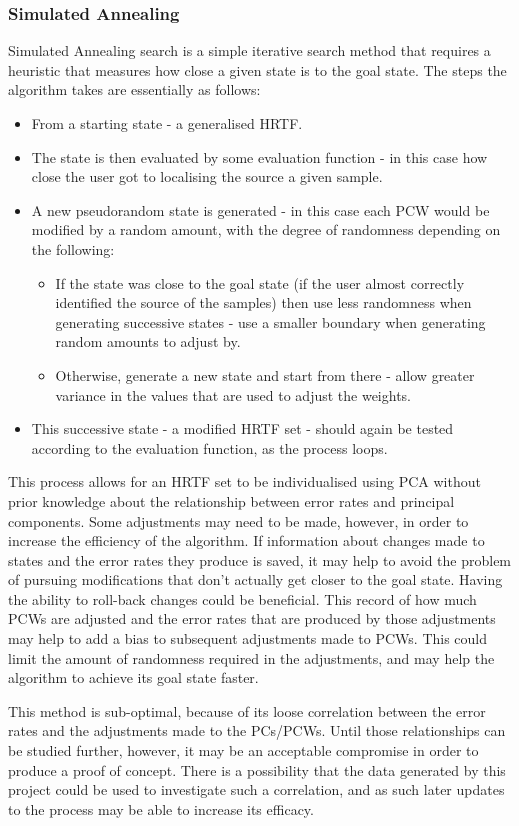 \subsubsection{Simulated Annealing}
Simulated Annealing \citep{vanLaarhoven1987} search is a simple iterative search method that requires a heuristic that measures how close a given state is to the goal state. The steps the algorithm takes are essentially as follows:
\begin{itemize}
\item From a starting state - a generalised HRTF.
\item The state is then evaluated by some evaluation function - in this case how close the user got to localising the source a given sample.
\item A new pseudorandom state is generated - in this case each PCW would be modified by a random amount, with the degree of randomness depending on the following:
\begin{itemize}
\item If the state was close to the goal state (if the user almost correctly identified the source of the samples) then use less randomness when generating successive states - use a smaller boundary when generating random amounts to adjust by.
\item Otherwise, generate a new state and start from there - allow greater variance in the values that are used to adjust the weights. 
\end{itemize}
\item This successive state - a modified HRTF set - should again be tested according to the evaluation function, as the process loops. 
\end{itemize}

This process allows for an HRTF set to be individualised using PCA without prior knowledge about the relationship between error rates and principal components. Some adjustments may need to be made, however, in order to increase the efficiency of the algorithm. If information about changes made to states and the error rates they produce is saved, it may help to avoid the problem of pursuing modifications that don't actually get closer to the goal state. Having the ability to roll-back changes could be beneficial. This record of how much PCWs are adjusted and the error rates that are produced by those adjustments may help to add a bias to subsequent adjustments made to PCWs. This could limit the amount of randomness required in the adjustments, and may help the algorithm to achieve its goal state faster. 

This method is sub-optimal, because of its loose correlation between the error rates and the adjustments made to the PCs/PCWs. Until those relationships can be studied further, however, it may be an acceptable compromise in order to produce a proof of concept. There is a possibility that the data generated by this project could be used to investigate such a correlation, and as such later updates to the process may be able to increase its efficacy. 